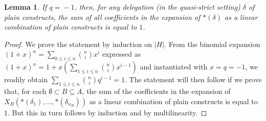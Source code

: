 \documentclass[11pt]{article}
\newtheorem{lemma}[theo]{Lemma}
\theoremstyle{definition}
\numberwithin{equation}{section}
\numberwithin{equation}{section}
\begin{document}
\begin{lemma} \label{sum-coeff1} If $q\!\!=\!\!-1$, then, for any delegation (in the quasi-strict setting)  $\delta$ of plain constructs, the sum of all coefficients in the expansion of  $\ast(\delta)$ as a linear combination of plain constructs is equal to $1$.
\end{lemma}
\begin{proof} We prove the statement by induction on $|H|$.
From the binomial expansion
 $(1+x)^n=\sum_{0\leq i\leq n}\binom{n}{i} x^i$ expressed as   $(1+x)^n=1 + x(\sum_{1\leq i\leq n}\binom{n}{i} x^{i-1})$
and instantiated with $x=q= -1$, we readily obtain $\sum_{1\leq i\leq n}\binom{n}{i} q^{i-1}=1$.  The statement will then follow if we prove that, for each $\emptyset\subset B\subseteq A$, the sum of the coefficients in the expansion of  
$X_B(\ast(\delta_1),\ldots, \ast(\delta_{n_B}))$ as a linear combination of plain constructs is equal to $1$. But this in turn follows by induction and by multilinearity.
 \end{proof}

 
\end{document}
